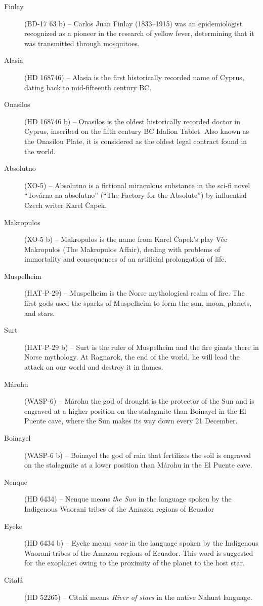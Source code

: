 \begin{description}
\item[Finlay] (BD-17 63 b) -- Carlos Juan Finlay (1833–1915) was an epidemiologist recognized as a pioneer in the research of yellow fever, determining that it was transmitted through mosquitoes.
\item[Alasia] (HD 168746) -- Alasia is the first historically recorded name of Cyprus, dating back to mid-fifteenth century BC.
\item[Onasilos] (HD 168746 b) -- Onasilos is the oldest historically recorded doctor in Cyprus, inscribed on the fifth century BC Idalion Tablet. Also known as the Onasilou Plate, it is considered as the oldest legal contract found in the world.
\item[Absolutno] (XO-5) -- Absolutno is a fictional miraculous substance in the sci-fi novel ``Továrna na absolutno'' (``The Factory for the Absolute'') by influential Czech writer Karel {\v{C}}apek.
\item[Makropulos] (XO-5 b) -- Makropulos is the name from Karel {\v{C}}apek's play Věc Makropulos (The Makropulos Affair), dealing with problems of immortality and consequences of an artificial prolongation of life.
\item[Muspelheim] (HAT-P-29) -- Muspelheim is the Norse mythological realm of fire. The first gods used the sparks of Muspelheim to form the sun, moon, planets, and stars.
\item[Surt] (HAT-P-29 b) -- Surt is the ruler of Muspelheim and the fire giants there in Norse mythology. At Ragnarok, the end of the world, he will lead the attack on our world and destroy it in flames.
\item[Márohu] (WASP-6) -- Márohu the god of drought is the protector of the Sun and is engraved at a higher position on the stalagmite than Boinayel in the El Puente cave, where the Sun makes its way down every 21 December.
\item[Boinayel] (WASP-6 b) -- Boinayel the god of rain that fertilizes the soil is engraved on the stalagmite at a lower position than Márohu in the El Puente cave.
\item[Nenque] (HD 6434) -- Nenque means \textit{the Sun} in the language spoken by the Indigenous Waorani tribes of the Amazon regions of Ecuador
\item[Eyeke] (HD 6434 b) -- Eyeke means \textit{near} in the language spoken by the Indigenous Waorani tribes of the Amazon regions of Ecuador. This word is suggested for the exoplanet owing to the proximity of the planet to the host star.
\item[Citalá] (HD 52265) -- Citalá means \textit{River of stars} in the native Nahuat language.

\end{description}
